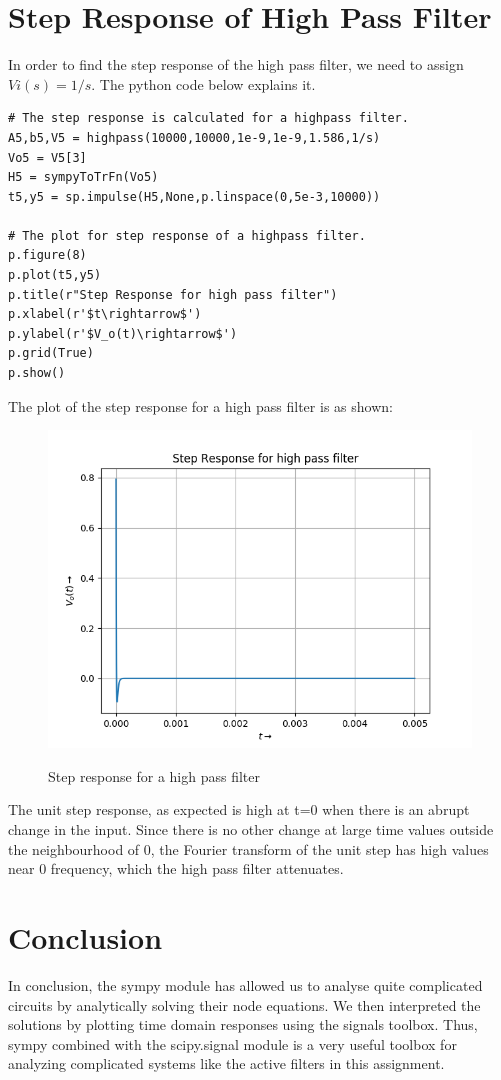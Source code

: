 \documentclass[11pt, a4paper]{article}
\begin{document}
\section*{Step Response of High Pass Filter}
In order to find the step response of the high pass filter, we need to assign $ Vi(s) = 1/s $. 
The python code below explains it.
\begin{verbatim}
# The step response is calculated for a highpass filter.
A5,b5,V5 = highpass(10000,10000,1e-9,1e-9,1.586,1/s)
Vo5 = V5[3]
H5 = sympyToTrFn(Vo5)
t5,y5 = sp.impulse(H5,None,p.linspace(0,5e-3,10000))

# The plot for step response of a highpass filter.
p.figure(8)
p.plot(t5,y5)
p.title(r"Step Response for high pass filter")
p.xlabel(r'$t\rightarrow$')
p.ylabel(r'$V_o(t)\rightarrow$')
p.grid(True)
p.show()	
\end{verbatim}
The plot of the step response for a high pass filter is as shown:
\begin{figure}[!tbh]
   	\centering
   	\includegraphics[scale=0.6]{Figure_8.png}
   	\label{fig:32}
   	\caption{Step response for a high pass filter}
   \end{figure}\newpage
The unit step response, as expected is high at t=0 when there is an abrupt
change in the input. Since there is no other change at large time values outside
the neighbourhood of 0, the Fourier transform of the unit step has high values
near 0 frequency, which the high pass filter attenuates.

\section*{Conclusion}
In conclusion, the sympy module has allowed us to analyse quite complicated circuits by analytically solving their node equations. We then interpreted the solutions by plotting time domain responses using the signals toolbox. Thus, sympy combined with the scipy.signal module is a very useful toolbox for analyzing complicated systems like the active filters in this assignment.   
\end{document}
